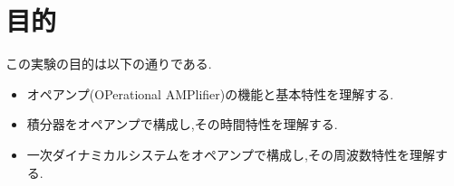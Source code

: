 \section{目的}
この実験の目的は以下の通りである.
\begin{itemize}
  \item オペアンプ(OPerational AMPlifier)の機能と基本特性を理解する.
  \item 積分器をオペアンプで構成し,その時間特性を理解する.
  \item 一次ダイナミカルシステムをオペアンプで構成し,その周波数特性を理解する.
\end{itemize}
